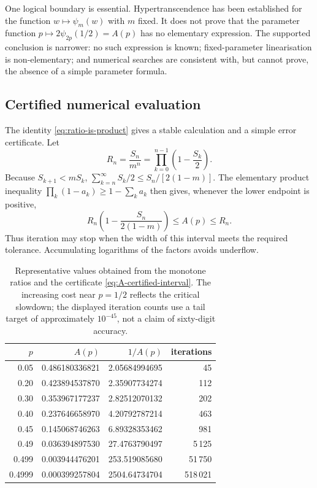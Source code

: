 One logical boundary is essential.  Hypertranscendence has been established for
the function \(w\mapsto\psi_m(w)\) with \(m\) fixed.  It does not prove that the
parameter function
\(p\mapsto2\psi_{2p}(1/2)=A(p)\) has no elementary expression.  The supported
conclusion is narrower: no such expression is known; fixed-parameter
linearisation is non-elementary; and numerical searches are consistent with,
but cannot prove, the absence of a simple parameter formula.

\subsection{Certified numerical evaluation}
\label{sec:practical}

The identity \eqref{eq:ratio-is-product} gives a stable calculation and a simple
error certificate.  Let
\[
  R_n=\frac{S_n}{m^n}
  =\prod_{k=0}^{n-1}\left(1-\frac{S_k}{2}\right).
\]
Because \(S_{k+1}<mS_k\),
\(
  \sum_{k=n}^{\infty}S_k/2\leq S_n/[2(1-m)].
\)
The elementary product inequality
\(\prod_k(1-a_k)\geq1-\sum_ka_k\) then gives, whenever the lower endpoint is
positive,
\begin{equation}
  R_n\left(1-\frac{S_n}{2(1-m)}\right)
  \leq A(p)\leq R_n.
  \label{eq:A-certified-interval}
\end{equation}
Thus iteration may stop when the width of this interval meets the required
tolerance.  Accumulating logarithms of the factors avoids underflow.

\begin{table}[htbp]
  \centering
  \caption{Representative values obtained from the monotone ratios and the
  certificate \eqref{eq:A-certified-interval}.  The increasing cost near
  \(p=1/2\) reflects the critical slowdown; the displayed iteration counts use a
  tail target of approximately \(10^{-45}\), not a claim of sixty-digit accuracy.}
  \label{tab:Avals}
  \begin{tabular}{@{}rrrr@{}}
    \toprule
    \(p\) & \(A(p)\) & \(1/A(p)\) & iterations \\
    \midrule
    0.05   & 0.486180336821 & 2.05684994695 & 45 \\
    0.20   & 0.423894537870 & 2.35907734274 & 112 \\
    0.30   & 0.353967177237 & 2.82512070132 & 202 \\
    0.40   & 0.237646658970 & 4.20792787214 & 463 \\
    0.45   & 0.145068746263 & 6.89328353462 & 981 \\
    0.49   & 0.036394897530 & 27.4763790497 & 5\,125 \\
    0.499  & 0.003944476201 & 253.519085680 & 51\,750 \\
    0.4999 & 0.000399257804 & 2504.64734704 & 518\,021 \\
    \bottomrule
  \end{tabular}
\end{table}

